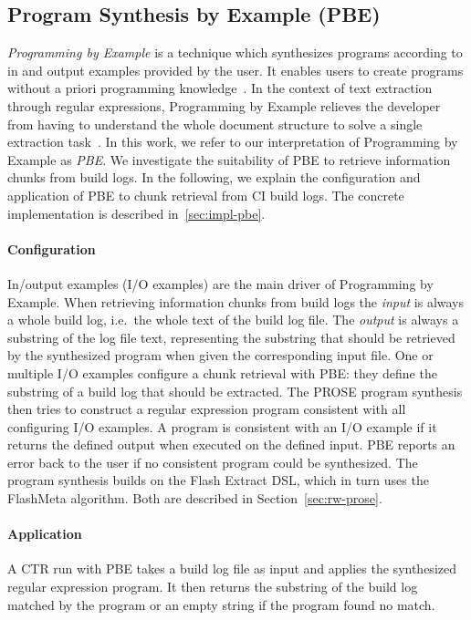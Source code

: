 \documentclass[\myrootdir/main.tex]{subfiles}
\begin{document}
\subsection{Program Synthesis by Example (PBE)}
\label{sec:expl-pbe}
\emph{Programming by Example} is a technique which synthesizes programs according to in and output examples provided by the user.
It enables users to create programs without a priori programming knowledge~\cite{mayer2015user}.
In the context of text extraction through regular expressions, Programming by Example relieves the developer from having to understand the whole document structure to solve a single extraction task~\cite{le2014flashextract:}.
In this work, we refer to our interpretation of Programming by Example as \emph{PBE}\@.
We investigate the suitability of PBE to retrieve information chunks from build logs.
In the following, we explain the configuration and application of PBE to chunk retrieval from CI build logs.
The concrete implementation is described in~\ref{sec:impl-pbe}.

\paragraph{Configuration}
In/output examples (I/O examples) are the main driver of Programming by Example.
When retrieving information chunks from build logs the \emph{input} is always a whole build log, i.e.\ the whole text of the build log file.
The \emph{output} is always a substring of the log file text, representing the substring that should be retrieved by the synthesized program when given the corresponding input file.
One or multiple I/O examples configure a chunk retrieval with PBE: they define the substring of a build log that should be extracted.
The PROSE program synthesis then tries to construct a regular expression program consistent with all configuring I/O examples.
A program is consistent with an I/O example if it returns the defined output when executed on the defined input.
PBE reports an error back to the user if no consistent program could be synthesized.
The program synthesis builds on the Flash Extract DSL, which in turn uses the FlashMeta algorithm.
Both are described in Section~\ref{sec:rw-prose}.

\paragraph{Application}
A CTR run with PBE takes a build log file as input and applies the synthesized regular expression program.
It then returns the substring of the build log matched by the program or an empty string if the program found no match.
\end{document}
